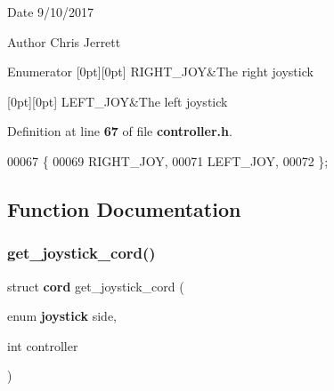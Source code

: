 \begin{DoxyDate}{Date}
9/10/2017 
\end{DoxyDate}
\begin{DoxyAuthor}{Author}
Chris Jerrett 
\end{DoxyAuthor}
\begin{DoxyEnumFields}{Enumerator}
[0pt][0pt]{}\mbox{\label{controller_8h_ac365c9e892abe4a1b85ae8f56a4eae5aae08a2d362c677f96f72d93047513cafe}} 
R\+I\+G\+H\+T\+\_\+\+J\+OY&The right joystick \\
\hline

[0pt][0pt]{}\mbox{\label{controller_8h_ac365c9e892abe4a1b85ae8f56a4eae5aaf822d7888862e67a3c624775b85c50a9}} 
L\+E\+F\+T\+\_\+\+J\+OY&The left joystick \\
\hline

\end{DoxyEnumFields}


Definition at line \textbf{ 67} of file \textbf{ controller.\+h}.


\begin{DoxyCode}
00067               \{
00069   RIGHT_JOY,
00071   LEFT_JOY,
00072 \};
\end{DoxyCode}


\subsection{Function Documentation}
\mbox{\label{controller_8h_a0ce0176099c0bb15ad8c36123222059d}} 
\subsubsection{get\+\_\+joystick\+\_\+cord()}
{\footnotesize\ttfamily struct \textbf{ cord} get\+\_\+joystick\+\_\+cord (\begin{DoxyParamCaption}\item[{enum \textbf{ joystick}}]{side,  }\item[{int}]{controller }\end{DoxyParamCaption})}



